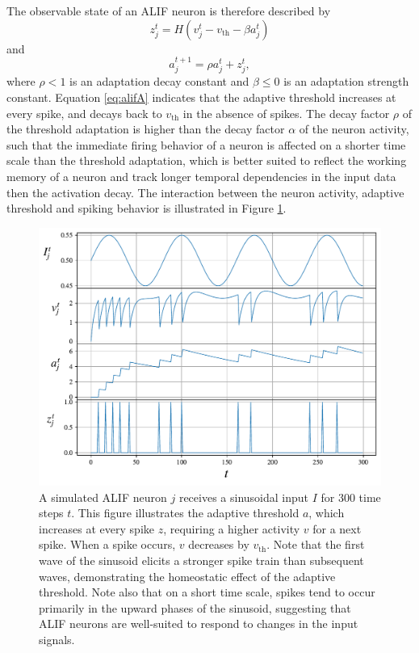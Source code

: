             The observable state of an ALIF neuron is therefore described by
            \begin{equation}\label{eq:alifZ}
            z^t_j = H\left(v_j^t - v_\text{th} - \beta a^t_j\right)
            \end{equation}
            and
            \begin{equation}\label{eq:alifA}
            a^{t+1}_j = \rho a^t_j + z^t_j,
            \end{equation}
            where $\rho < 1$ is an adaptation decay constant and $\beta \leq 0$ is an adaptation strength constant.
            Equation \ref{eq:alifA} indicates that the adaptive threshold increases at every spike, and decays back to $v_\text{th}$ in the absence of spikes.
            The decay factor $\rho$ of the threshold adaptation is higher than the decay factor $\alpha$ of the neuron activity, such that the immediate firing behavior of a neuron is affected on a shorter time scale than the threshold adaptation, which is better suited to reflect the working memory of a neuron and track longer temporal dependencies in the input data then the activation decay.
            The interaction between the neuron activity, adaptive threshold and spiking behavior is illustrated in Figure \ref{fig:simplealif}.

            \begin{figure}[!ht]
                \centering
                \includegraphics[width=\linewidth]{gfx/simplealif}
                \caption[ALIF neuron simulation]{A simulated ALIF neuron $j$ receives a sinusoidal input $I$ for 300 time steps $t$. This figure illustrates the adaptive threshold $a$, which increases at every spike $z$, requiring a higher activity $v$ for a next spike. When a spike occurs, $v$ decreases by $v_\text{th}$. Note that the first wave of the sinusoid elicits a stronger spike train than subsequent waves, demonstrating the homeostatic effect of the adaptive threshold. Note also that on a short time scale, spikes tend to occur primarily in the upward phases of the sinusoid, suggesting that ALIF neurons are well-suited to respond to changes in the input signals.}
                \label{fig:simplealif}
            \end{figure}

